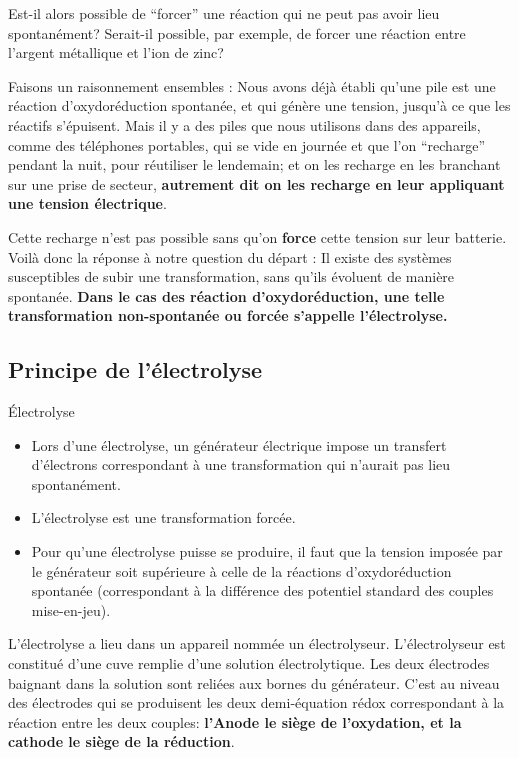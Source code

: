 \documentclass[11pt,a4paper]{article}
\begin{document}
Est-il alors possible de ``forcer'' une réaction qui ne peut pas avoir lieu spontanément? Serait-il possible, par exemple, de forcer une réaction entre l'argent métallique et l'ion de zinc? 

Faisons un raisonnement ensembles : Nous avons déjà établi qu'une pile est une réaction d'oxydoréduction spontanée, et qui génère une tension, jusqu'à ce que les réactifs s'épuisent. Mais il y a des piles que nous utilisons dans des appareils, comme des téléphones portables, qui se vide en journée et que l'on ``recharge'' pendant la nuit, pour réutiliser le lendemain; et on les recharge en les branchant sur une prise de secteur, \textbf{autrement dit on les recharge en leur appliquant une tension électrique}.  

Cette recharge n'est pas possible sans qu'on \textbf{force} cette tension sur leur batterie. Voilà donc la réponse à notre question du départ : Il existe des systèmes susceptibles de subir une transformation, sans qu'ils évoluent de manière spontanée. \textbf{Dans le cas des réaction d'oxydoréduction, une telle transformation non-spontanée ou forcée s'appelle l'électrolyse. }

\subsection{Principe de l'électrolyse}

\begin{defn}{Électrolyse}
\begin{itemize}
    \item Lors d'une électrolyse, un générateur électrique impose un transfert d'électrons correspondant à une transformation qui n'aurait pas lieu spontanément. 
    \item L'électrolyse est une transformation forcée. 
    \item Pour qu'une électrolyse puisse se produire, il faut que la tension imposée par le générateur soit supérieure à celle de la réactions d'oxydoréduction spontanée (correspondant à la différence des potentiel standard des couples mise-en-jeu). 
\end{itemize}
\end{defn}

L'électrolyse a lieu dans un appareil nommée un électrolyseur. L'électrolyseur est constitué d'une cuve remplie d'une solution électrolytique. Les deux électrodes baignant dans la solution sont reliées aux bornes du générateur. C'est au niveau des électrodes qui se produisent les deux demi-équation rédox correspondant à la réaction entre les deux couples:\textbf{ l'Anode le siège de l'oxydation, et la cathode le siège de la réduction}. 
\end{document}

